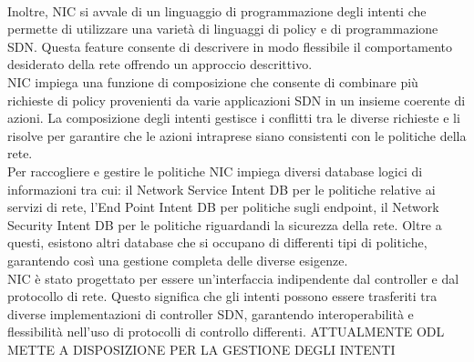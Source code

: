 \\Inoltre, NIC si avvale di un linguaggio di programmazione degli intenti che permette di utilizzare una varietà di linguaggi di policy e di programmazione SDN.
Questa feature consente di descrivere in modo flessibile il comportamento desiderato della rete offrendo un approccio descrittivo.
\\NIC impiega una funzione di composizione che consente di combinare più richieste di policy provenienti da varie applicazioni SDN in un insieme coerente di azioni.
La composizione degli intenti gestisce i conflitti tra le diverse richieste e li risolve per garantire che le azioni intraprese siano consistenti con le politiche della rete.
\\Per raccogliere e gestire le politiche NIC impiega diversi database logici di informazioni tra cui: il Network Service Intent DB per le politiche relative ai servizi di rete,
l'End Point Intent DB per politiche sugli endpoint, il Network Security Intent DB per le politiche riguardandi la sicurezza della rete\cite{NICProposal}.
Oltre a questi, esistono altri database che si occupano di differenti tipi di politiche, garantendo così una gestione completa delle diverse esigenze.
\\NIC è stato progettato per essere un'interfaccia indipendente dal controller e dal protocollo di rete.
Questo significa che gli intenti possono essere trasferiti tra diverse implementazioni di controller SDN, garantendo interoperabilità e flessibilità nell'uso di protocolli di controllo differenti.
ATTUALMENTE ODL METTE A DISPOSIZIONE PER LA GESTIONE DEGLI INTENTI
